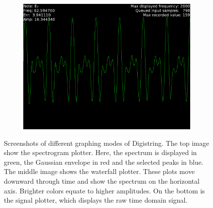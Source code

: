 \documentclass[a4paper,10pt,twocolumn]{article}
\begin{document}
\begin{figure}[p!]
\begin{subfigure}{\linewidth}
    \end{subfigure}
    \begin{subfigure}{\linewidth}
        \includegraphics[width=\linewidth]{fig/digi_wave.png}
    \end{subfigure}
    \caption{Screenshots of different graphing modes of Digistring. The top image show the spectrogram plotter. Here, the spectrum is displayed in green, the Gaussian envelope in red and the selected peaks in blue. The middle image shows the waterfall plotter. These plots move downward through time and show the spectrum on the horizontal axis. Brighter colors equate to higher amplitudes. On the bottom is the signal plotter, which displays the raw time domain signal.}
    \label{fig:screens}
\end{figure}
\end{document}

